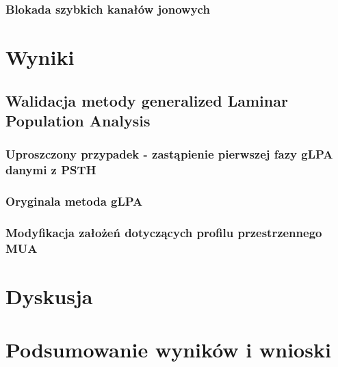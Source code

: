\documentclass[a4paper,12pt,polish]{book}
\begin{document}
\subsection{Blokada szybkich kanałów jonowych}


\chapter{Wyniki}
\section{Walidacja metody generalized Laminar Population Analysis}
\subsection{Uproszczony przypadek - zastąpienie pierwszej fazy gLPA danymi z PSTH}
\subsection{Oryginala metoda gLPA}
\subsection{Modyfikacja założeń dotyczących profilu przestrzennego MUA}


\chapter{Dyskusja}

\chapter{Podsumowanie wyników i wnioski}






\end{document}
